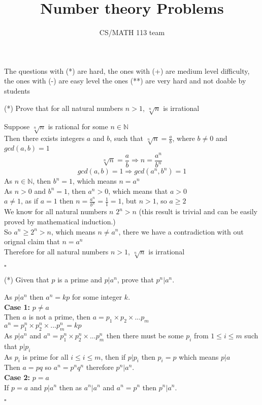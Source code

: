 \documentclass{exam}
\title{Number theory Problems}
\author{CS/MATH 113 team}
\begin{document}
\maketitle
The questions with (*) are hard, the ones with (+) are medium level difficulty, the ones with (-) are easy level the ones (**) are very hard and not doable by students
\begin{questions}
    \question (*) Prove that for all natural numbers $n>1$, $ \sqrt[n]{n}$ is irrational
    \begin{solution}
        Suppose $\sqrt[n]{n}$ is rational for some $n \in \mathbb{N}$
        \\Then there exists integers $a$ and $b$, such that $\sqrt[n]{n} = \frac{a}{b}$, where $b \neq 0$ and $gcd(a,b) =1$
        $$\sqrt[n]{n} = \frac{a}{b} \Rightarrow n = \frac{a^n}{b^n}$$
        $$gcd(a,b) =1 \Rightarrow gcd(a^n,b^n) =1$$
        As $n \in \mathbb{N}$, then $b^n = 1$, which means $n = a^n$
        \\As $n > 0$ and $b^n = 1$, then $a^n > 0$, which means that $a > 0$
        \\$a \neq 1$, as if $a = 1$ then $n = \frac{a^n}{b^n} = \frac{1}{1} = 1$, but $n > 1$, so $a \geq 2$
        \\We know for all natural numbers $n$ $2^n > n$ (this result is trivial and can be easily proved by mathematical induction.)
        \\So $a^n \geq 2^n > n$, which means $n \neq a^n$, there we have a contradiction with out orignal claim that $n = a^n$
        \\Therefore for all natural numbers $n>1$, $ \sqrt[n]{n}$ is irrational
        \begin{flushright}
            $\square$
        \end{flushright}
    \end{solution}

    \question (*) Given that $p$ is a prime and $p|a^n$, prove that $p^n|a^n$.
    \begin{solution}
        As $p|a^n$ then $a^n = kp$ for some integer $k$.
        \\\textbf{Case 1:} $p \neq a$
        \\Then $a$ is not a prime, then $a = p_1\times p_2 \times ... p_m$
        \\$a^n = p_1^n\times p_2^n \times ... p_m^n = kp$
        \\As $p|a^n$ and $a^n = p_1^n\times p_2^n \times ... p_m^n$ then there must be some $p_i$ from $1\leq i \leq m$ such that $p|p_i$
        \\As $p_i$ is prime for all $i \leq i \leq m$, then if $p|p_i$ then $p_i = p$ which means $p|a$
        \\Then $a = pq$ so $a^n = p^n q^n$ therefore $p^n|a^n$.
        \\\textbf{Case 2:} $p = a$ 
        \\If $p = a$  and $p|a^n$ then as $a^n|a^n$ and $a^n=p^n$ then $p^n|a^n$.
        \begin{flushright}
            $\square$
        \end{flushright}
    \end{solution}
    \pagebreak


\end{questions}
\end{document}
